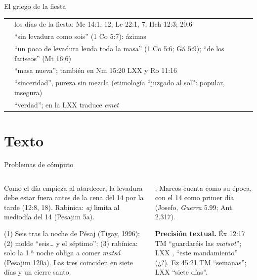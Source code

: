 \begin{frame}{El griego de la fiesta}
\scriptsize\renewcommand{\arraystretch}{1.15}
\begin{tabular}{@{}L{3.1cm}L{8.9cm}@{}}
\toprule
{} & los días de la fiesta: Mc 14:1, 12; Lc 22:1, 7; Hch 12:3; 20:6 \\
 & ``sin levadura como sois'' (1 Co 5:7):  ázimas \\
 & ``un poco de levadura leuda toda la masa'' (1 Co 5:6; Gá 5:9); ``de los fariseos'' (Mt 16:6) \\
 & ``masa nueva'';  también en Nm 15:20 LXX y Ro 11:16 \\
 & ``sinceridad'', pureza sin mezcla (etimología ``juzgado al sol'': popular, insegura) \\
 & ``verdad''; en la LXX traduce \emph{emet} \\
\bottomrule
\end{tabular}
\end{frame}

\section{Texto}

\begin{frame}{Problemas de cómputo}
\begin{columns}[t,onlytextwidth]
\begin{column}{0.49\textwidth}\scriptsize
{} Como el día empieza al atardecer, la levadura debe estar fuera antes de la cena del 14 por la tarde (12:8, 18). Rabínica: \emph{aj} limita al mediodía del 14 (Pesajim 5a).\par\medskip
{} (1) Seis tras la noche de Pésaj (Tigay, 1996); (2) molde ``seis\ldots{} y el séptimo''; (3) rabínica: solo la 1.ª noche obliga a comer \emph{matsá} (Pesajim 120a). Las tres coinciden en siete días y un cierre santo.
\end{column}
\begin{column}{0.49\textwidth}\scriptsize
{} : Marcos cuenta como su época, con el 14 como primer día (Josefo, \emph{Guerra} 5.99; Ant. 2.317).\par\medskip
\begin{tcolorbox}[colback=papiro,colframe=mostaza!80!tierraroja,boxrule=0.8pt,arc=2pt,left=3pt,right=3pt,top=2pt,bottom=2pt]
\textbf{Precisión textual.} Éx 12:17 TM ``guardaréis las \emph{matsot}''; LXX , ``este mandamiento'' (¿?). Ez 45:21 TM ``semanas''; LXX ``siete días''.
\end{tcolorbox}
\end{column}
\end{columns}
\end{frame}


